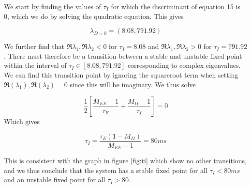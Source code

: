 \documentclass{article}
\begin{document}
We start by finding the values of $\tau_I$ for which the discriminant of equation 15 is 0, which we do by solving the quadratic equation. This gives

\begin{equation}
\lambda_{D=0} = (8.08, 791.92)
\end{equation}

We further find that $\Re{\lambda_1}, \Re{\lambda_2} < 0$ for $\tau_I = 8.08$ and $\Re{\lambda_1}, \Re{\lambda_2} > 0$ for $\tau_I = 791.92$. There must therefore be a transition between a stable and unstable fixed point within the interval of $\tau_I \in [8.08, 791.92]$ corresponding to complex eigenvalues. We can find this transition point by ignoring the squareroot term when setting $\Re{(\lambda_{1})}, \Re{(\lambda_{2} )}= 0$ since this will be imaginary. We thus solve

\begin{equation}
 \dfrac{1}{2}[\dfrac{M_{EE}-1}{\tau_E}+\dfrac{M_{II}-1}{\tau_I} ] = 0
\end{equation}
Which gives

\begin{equation}
\tau_I = \dfrac{\tau_E(1-M_{II})}{M_{EE}-1} = 80 ms
\end{equation}

This is consistent with the graph in figure \ref{fig:ti} which show no other transitions, and we thus conclude that the system has a stable fixed point for all $\tau_I < 80 ms$ and an unstable fixed point for all $\tau_I > 80$.
\end{document}
